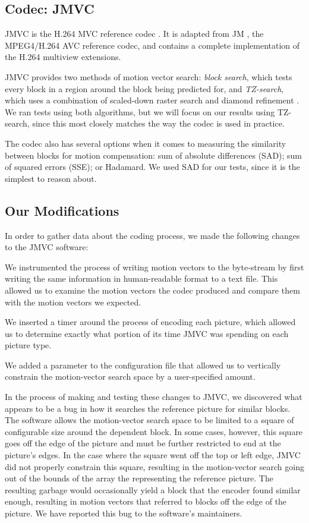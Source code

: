 \documentclass{sig-alternate-05-2015}
\begin{document}
\subsection{Codec: JMVC}
\label{subsec:jmvc}
JMVC is the H.264 MVC reference codec \cite{schwarz:jmvc}. It is adapted from
JM \cite{suehring:jm}, the MPEG4/H.264 AVC reference codec, and contains a
complete implementation of the H.264 multiview extensions.

JMVC provides two methods of motion vector search: {\it block search}, which
tests every block in a region around the block being predicted for, and {\it
TZ-search}, which uses a combination of scaled-down raster search and diamond
refinement \cite{purnachand:improvements}. We ran tests using both algorithms,
but we will focus on our results using TZ-search, since this most closely
matches the way the codec is used in practice.

The codec also has several options when it comes to measuring the similarity
between blocks for motion compensation: sum of absolute differences (SAD); sum
of squared errors (SSE); or Hadamard. We used SAD for our tests, since it is
the simplest to reason about.

\subsection{Our Modifications}
\label{subsec:modifications}
In order to gather data about the coding process, we made the following changes
to the JMVC software: \begin{compactenum}
\item We instrumented the process of writing motion vectors to the byte-stream
by first writing the same information in human-readable format to a text file.
This allowed us to examine the motion vectors the codec produced and compare
them with the motion vectors we expected.
\item We inserted a timer around the process of encoding each picture, which
allowed us to determine exactly what portion of its time JMVC was spending on
each picture type.
\item We added a parameter to the configuration file that allowed us to
vertically constrain the motion-vector search space by a user-specified amount.
\end{compactenum}

In the process of making and testing these changes to JMVC, we discovered what
appears to be a bug in how it searches the reference picture for similar blocks.
The software allows the motion-vector search space to be limited to a square of
configurable size around the dependent block. In some cases, however, this
square goes off the edge of the picture and must be further restricted to end
at the picture's edges. In the case where the square went off the top or left
edge, JMVC did not properly constrain this square, resulting in the
motion-vector search going out of the bounds of the array the representing the
reference picture. The resulting garbage would occasionally yield a block that
the encoder found similar enough, resulting in motion vectors that referred to
blocks off the edge of the picture. We have reported this bug to the software's
maintainers.
\end{document}
